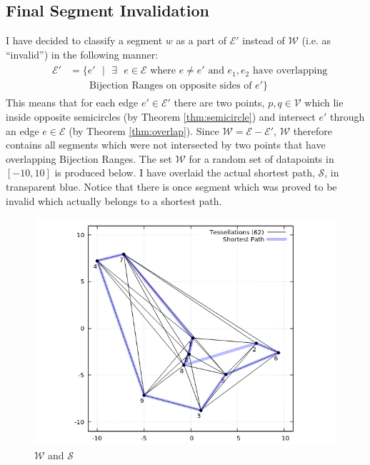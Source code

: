 \documentclass[12pt]{article}
\begin{document}
\subsection*{Final Segment Invalidation}
I have decided to classify a segment $w$ as a part of $\mathcal{E}'$ instead of
$\mathcal{W}$ (i.e. as ``invalid'') in the following manner:
\begin{align*}
&\begin{aligned}
\mathcal{E}' &= \{e'\text{ }|\text{ }\exists\text{ }e \in \mathcal{E} \text{ where } e \neq e'
\text{ and } e_1,e_2 \text{ have overlapping}\\
&\qquad \text{Bijection Ranges on opposite sides of } e'\}
\end{aligned}
\end{align*}
This means that for each edge $e' \in \mathcal{E}'$ there are two points,
$p,q \in \mathcal{V}$ which lie inside opposite semicircles
(by Theorem \ref{thm:semicircle}) and intersect $e'$ through an edge $e \in \mathcal{E}$
(by Theorem \ref{thm:overlap}). Since $\mathcal{W} = \mathcal{E} - \mathcal{E}'$,
$\mathcal{W}$ therefore contains all segments which were not intersected by two
points that have overlapping Bijection Ranges.
The set $\mathcal{W}$ for a random set of datapoints
in $[-10, 10]$ is produced below. I have overlaid the actual shortest path,
$\mathcal{S}$, in transparent blue. Notice that there is once segment which
was proved to be invalid which actually belongs to a shortest path.
\begin{figure}[h!]
\begin{center}
\includegraphics{w_random}
\end{center}
\caption{$\mathcal{W}$ and $\mathcal{S}$}\label{fig:W-random}
\end{figure}
\end{document}
